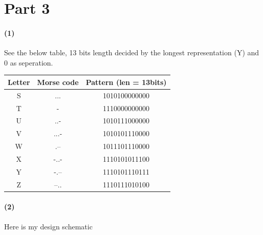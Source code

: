 \documentclass{article}
\begin{document}
\section*{Part 3}
\paragraph{(1)} See the below table, 13 bits length decided by the longest representation (Y) and 0 as seperation.
\begin{center}
    \begin{tabular}{|c|c|c|}
    \hline
    Letter & Morse code & Pattern (len = 13bits) \\ \hline
    S      & ...        & 1010100000000         \\ \hline
    T      & -          & 1110000000000         \\ \hline
    U      & ..-        & 1010111000000         \\ \hline
    V      & ...-       & 1010101110000         \\ \hline
    W      & .--        & 1011101110000         \\ \hline
    X      & -..-       & 1110101011100         \\ \hline
    Y      & -.--       & 1110101110111         \\ \hline
    Z      & --..       & 1110111010100         \\ \hline
    \end{tabular}
\end{center}

\paragraph{(2)} Here is my design schematic
\end{document}
